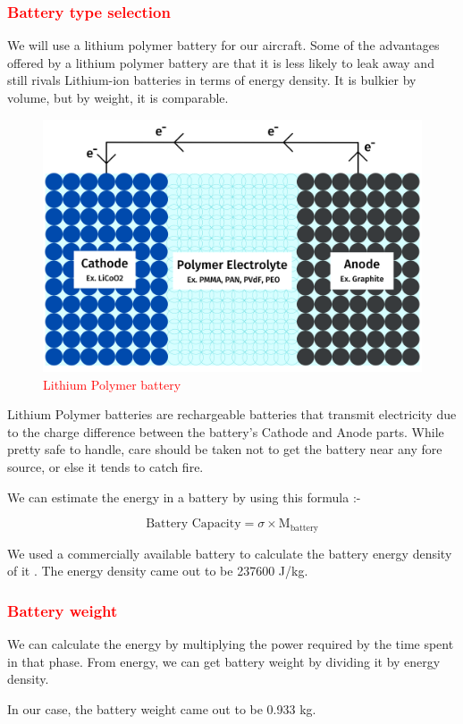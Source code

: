 \documentclass[12 pt]{article}
\begin{document}
\subsubsection{\textcolor{red}{Battery type selection \cite{Lipobattery}}}
We will use a lithium polymer battery for our aircraft. Some of the advantages offered by a lithium polymer battery are that it is less likely to leak away and still rivals Lithium-ion batteries in terms of energy density. It is bulkier by volume, but by weight, it is comparable.

\begin{figure}[h]
    \centering
    \includegraphics[width=0.5\linewidth]{Extra pics/LiPo_battery_diagram.png}
    \caption{\textcolor{red}{Lithium Polymer battery}}
    \label{Lithium Polymer battery}
\end{figure}

Lithium Polymer batteries are rechargeable batteries that transmit electricity due to the charge difference between the battery's Cathode and Anode parts. While pretty safe to handle, care should be taken not to get the battery near any fore source, or else it tends to catch fire.

We can estimate the energy in a battery by using this formula \cite{Lipobattery}:-

$$ \text{Battery Capacity} = \sigma \times \text{M}_\text{battery} $$

We used a commercially available battery to calculate the battery energy density of it \cite{Batteryref}. The energy density came out to be 237600 J/kg.

\subsubsection{\textcolor{red}{Battery weight}}

We can calculate the energy by multiplying the power required by the time spent in that phase. From energy, we can get battery weight by dividing it by energy density. 

In our case, the battery weight came out to be 0.933 kg.
\end{document}
